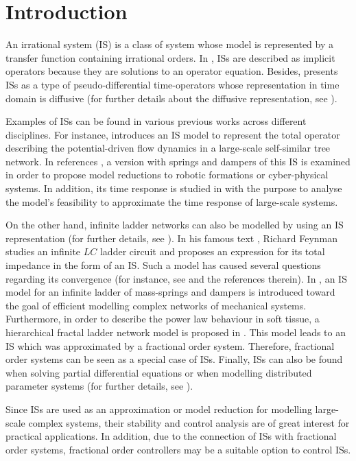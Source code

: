 \documentclass[twoside,reqno,11pt]{fcaa-var} %
\begin{document}
\section{Introduction}\label{sec:1}
An irrational system (IS) is a class of system whose model is represented by a transfer function containing irrational orders. In \cite{Sen2018,Mayes2011}, ISs are described as implicit operators because they are solutions to an operator equation. Besides,\cite{Montseny1998} presents ISs as a type of pseudo-differential time-operators whose representation in time domain is diffusive (for further details about the diffusive representation, see \cite{Casenave2010}). \par 
Examples of ISs can be found in various previous works across different disciplines. For instance, \cite{Mayes2011} introduces an IS model to represent the total operator describing the potential-driven flow dynamics in a large-scale self-similar tree network. In references \cite{Goodwine2018,Leyden2016}, a version with springs and dampers of this IS is examined in order to propose model reductions to robotic formations or cyber-physical systems. In addition, its time response is studied in \cite{Guel-Cortez2018b} with the purpose to analyse the model's feasibility to approximate the time response of large-scale systems. \par 
On the other hand, infinite ladder networks can also be modelled by using an IS representation (for further details, see \cite{Sen2018}). In his famous text \cite{Feynman2006}, Richard Feynman studies an infinite $LC$ ladder circuit and proposes an expression for its total impedance in the form of an IS. Such a model has caused several questions regarding its convergence (for instance, see \cite{Klimo_2016,muranova2019effective} and the references therein). In \cite{Leyden2018a}, an IS model for an infinite ladder of mass-springs and dampers is introduced toward the goal of efficient modelling complex networks of mechanical systems. Furthermore, in order to describe the power law behaviour in soft tissue, a hierarchical fractal ladder network model is proposed in \cite{Kelly2009}. This model leads to an IS which was approximated by a fractional order system. Therefore, fractional order systems can be seen as a special case of ISs. Finally, ISs can also be found when solving partial differential equations or when modelling distributed parameter systems (for further details, see \cite{Curtain1992,Curtain1995,Hernandez2013,Wu2007}). \par 
Since ISs are used as an approximation or model reduction for modelling large-scale complex systems, their stability and control analysis are of great interest for practical applications. In addition, due to the connection of ISs with fractional order systems, fractional order controllers may be a suitable option to control ISs. \par 
\end{document}
